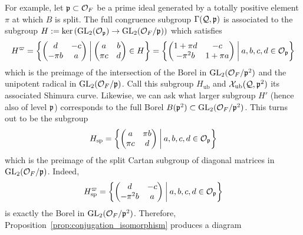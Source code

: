 \documentclass[main.tex]{subfiles}
\begin{document}
\begin{example} \label{example:conjugation_p_squared_level}
For example, let $\mathfrak{p} \subset \mathcal{O}_F$ be a prime ideal generated by a totally positive element $\pi$ at which $B$ is split. The full congruence subgroup $\Gamma(\mathcal{Q}, \mathfrak{p})$ is associated to the subgroup $H := \ker{(\mathrm{GL}_2(\mathcal{O}_{\mathfrak{p}}) \to \mathrm{GL}_2(\mathcal{O}_F / \mathfrak{p}))}$ which satisfies
\[ H^{\varpi} = \left \{
\begin{pmatrix}
d & - c
\\
- \pi b & a
\end{pmatrix} \: \middle| \:
\begin{pmatrix}
a & b
\\
\pi c & d
\end{pmatrix}
\in H
\right \} = \left \{ \begin{pmatrix}
1 + \pi d & - c
\\
- \pi^2 b & 1 + \pi a
\end{pmatrix} \: \middle| \:
a, b, c, d \in \mathcal{O}_{\mathfrak{p}}
\right\}  \]
which is the preimage of the intersection of the Borel in $\mathrm{GL}_2(\mathcal{O}_F / \mathfrak{p}^2)$ and the unipotent radical in $\mathrm{GL}_2(\mathcal{O}_F / \mathfrak{p})$. Call this subgroup $H_{\mathrm{ub}}$ and $\mathcal{X}_{\mathrm{ub}}(\mathcal{Q}, \mathfrak{p}^2)$ its associated Shimura curve. Likewise, we can ask what larger subgroup $H'$ (hence also of level $\mathfrak{p}$) corresponds to the full Borel $B(\mathfrak{p}^2) \subset \mathrm{GL}_2(\mathcal{O}_F / \mathfrak{p}^2)$. This turns out to be the subgroup
\[ H_{\mathrm{sp}} = \left \{
\begin{pmatrix}
a & \pi b
\\
\pi c & d
\end{pmatrix}
\: \middle| \:
a, b, c, d \in \mathcal{O}_{\mathfrak{p}}
\right\}  \]
which is the preimage of the split Cartan subgroup of diagonal matrices in $\mathrm{GL}_2(\mathcal{O}_F / \mathfrak{p})$. Indeed,
\[ H_{\mathrm{sp}}^{\varpi} = \left \{ \begin{pmatrix}
d & - c
\\
- \pi^2 b & a
\end{pmatrix} \: \middle| \:
a, b, c, d \in \mathcal{O}_{\mathfrak{p}}
\right\}  \]
is exactly the Borel in $\mathrm{GL}_2(\mathcal{O}_F/\mathfrak{p}^2)$. Therefore, Proposition~\ref{prop:conjugation_isomorphism} produces a diagram
\begin{center}
\end{center}
\end{example}
\end{document}
